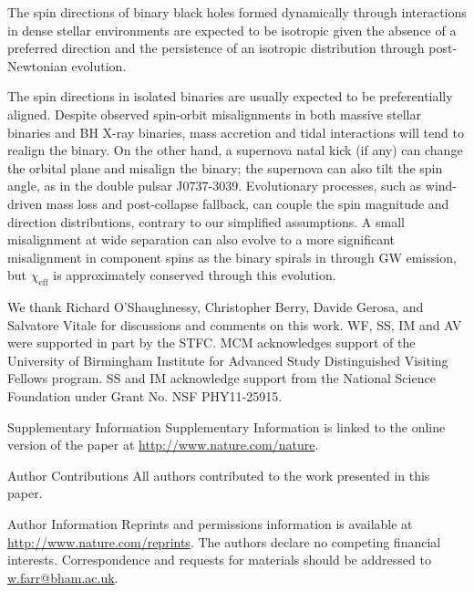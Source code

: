 \documentclass{nature}
\newcommand{\chieff}{\chi_\mathrm{eff}}
\begin{document}
The spin directions of binary black holes formed dynamically through
interactions in dense stellar
environments\cite{SigurdssonHernquist:1993,1993Natur.364..421K,PZMcMillan:2000,Rodriguez:2015,Stone:2016}
are expected to be isotropic given the absence of a preferred
direction\cite{2016ApJ...832L...2R} and the persistence of an
isotropic distribution through post-Newtonian
evolution\cite{2004PhRvD..70l4020S,2007ApJ...661L.147B}.

The spin directions in isolated
binaries\cite{TutukovYungelson:1973,TutukovYungelson:1993,Lipunov:1997,2016Natur.534..512B,Stevenson:2017,MandeldeMink:2016,Marchant:2016}
are usually expected to be preferentially aligned.  Despite observed
spin-orbit misalignments in both massive stellar
binaries\cite{Albrecht:2009,2014ApJ...785...83A} and BH X-ray
binaries\cite{Orosz:2001,Martin:2008b,Martin:2008,MorningstarMiller:2014},
mass accretion and tidal interactions will tend to realign the binary.
On the other hand, a supernova natal kick (if any) can change the
orbital plane and misalign the
binary\cite{2000ApJ...541..319K,2013PhRvD..87j4028G}; the supernova
can also tilt the spin angle, as in the double pulsar
J0737-3039\cite{2011ApJ...742...81F}.  Evolutionary processes, such as
wind-driven mass loss and post-collapse fallback, can couple the spin
magnitude and direction distributions, contrary to our simplified
assumptions.  A small misalignment at wide separation can also evolve
to a more significant misalignment in component spins as the binary
spirals in through \ac{GW} emission\cite{2015PhRvD..92f4016G}, but
$\chieff$ is approximately conserved through this evolution.

\begin{addendum}
\item We thank Richard O'Shaughnessy, Christopher Berry, Davide
  Gerosa, and Salvatore Vitale for discussions and comments on this
  work.  WF, SS, IM and AV were supported in part by the STFC.  MCM
  acknowledges support of the University of Birmingham Institute for
  Advanced Study Distinguished Visiting Fellows program.  SS and IM
  acknowledge support from the National Science Foundation under Grant
  No. NSF PHY11-25915.
\item[Supplementary Information] Supplementary Information is linked
  to the online version of the paper at
  \url{http://www.nature.com/nature}.
\item[Author Contributions] All authors contributed to the work
  presented in this paper.
\item[Author Information] Reprints and permissions information is
  available at \url{http://www.nature.com/reprints}.  The authors
  declare no competing financial interests.  Correspondence and
  requests for materials should be addressed to
  \href{mailto:w.farr@bham.ac.uk}{w.farr@bham.ac.uk}.
\end{addendum}
\end{document}
